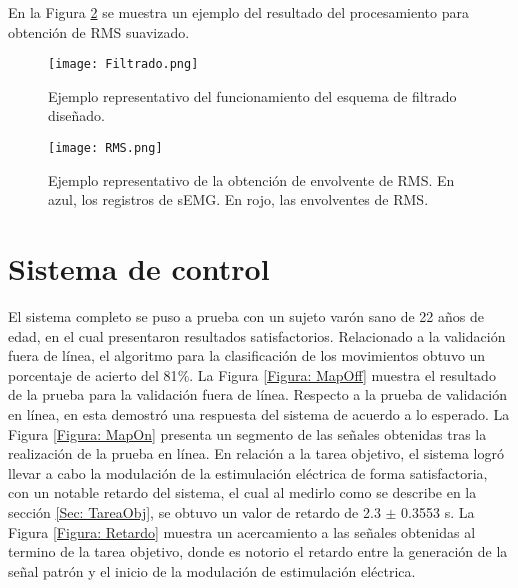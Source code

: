 En la Figura \ref{Figura: RMS} se muestra un ejemplo del resultado del procesamiento para obtención de RMS suavizado.


\begin{figure}[htbp]
	\centering
	\texttt{[image: Filtrado.png]}
	\caption{Ejemplo representativo del funcionamiento del esquema de filtrado diseñado.}
	\label{Figura: Filtrado}
\end{figure}


\begin{figure}[htbp]
	\centering
	\texttt{[image: RMS.png]}
	\caption[Ejemplo representativo de la obtención de envolvente de RMS]{Ejemplo representativo de la obtención de envolvente de RMS. En azul, los registros de sEMG. En rojo, las envolventes de RMS.}
	\label{Figura: RMS}
\end{figure}


\section{Sistema de control}
El sistema completo se puso a prueba con un sujeto varón sano de 22 años de edad, en el cual presentaron resultados satisfactorios. Relacionado a la validación fuera de línea, el algoritmo para la clasificación de los movimientos obtuvo un porcentaje de acierto del 81$\%$. La Figura \ref{Figura: MapOff} muestra el resultado de la prueba para la validación fuera de línea. Respecto a la prueba de validación en línea, en esta demostró una respuesta del sistema de acuerdo a lo esperado. La Figura \ref{Figura: MapOn} presenta un segmento de las señales obtenidas tras la realización de la prueba en línea. En relación a la tarea objetivo, el sistema logró llevar a cabo la modulación de la estimulación eléctrica de forma satisfactoria, con un notable retardo del sistema, el cual al medirlo como se describe en la sección \ref{Sec: TareaObj}, se obtuvo un valor de retardo de 2.3 $\pm$ 0.3553 s. La Figura \ref{Figura: Retardo} muestra un acercamiento a las señales obtenidas al termino de la tarea objetivo, donde es notorio el retardo entre la generación de la señal patrón y el inicio de la modulación de estimulación eléctrica.


